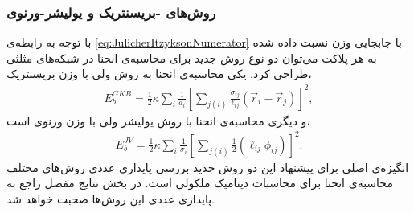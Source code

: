 \subsubsection{
روش‌های -بریسنتریک و یولیشر-ورنوی
}
با توجه به رابطه‌ی 
\ref{eq:JulicherItzyksonNumerator}
با جابجایی وزن نسبت داده شده به هر پلاکت می‌توان دو نوع روش جدید برای محاسبه‌ی انحنا در شبکه‌های مثلثی طراحی کرد. یکی محاسبه‌ی انحنا به روش  ولی با وزن بریسنتریک،
\begin{eqnarray}
E_{b}^{GKB}=\frac{1}{2}\kappa\sum_{i}\frac{1}{a_i}\left[\sum_{j(i)}\frac{\sigma_{ij}}{\ell_{ij}}(\vec r_i-\vec r_j)\right]^2,
\label{eq:ItzyksonBarycentricPotential}
\end{eqnarray}
و دیگری محاسبه‌ی انحنا با روش یولیشر ولی با وزن ورنوی است،
\begin{eqnarray}
E_{b}^{JV}=\frac{1}{2}\kappa\sum_{i}\frac{1}{\sigma_i}\left[\sum_{j(i)}\frac{1}{2}(\ell_{ij}\phi_{ij})\right]^2.
\label{eq:JulicherVoronoiPotential}
\end{eqnarray}
انگیزه‌ی اصلی برای پیشنهاد این دو روش جدید بررسی پایداری عددی روش‌های مختلف محاسبه‌ی انحنا برای محاسبات دینامیک ملکولی است.  در بخش نتایج مفصل راجع به پایداری عددی این روش‌ها صحبت خواهد شد.








 